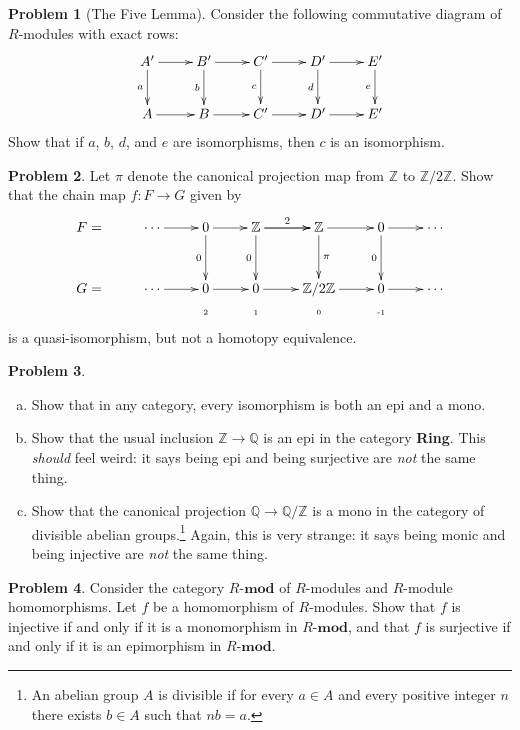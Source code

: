 \documentclass[11pt]{article}
\newcommand{\ZZ}{\mathbb{Z}}
\theoremstyle{definition}
\newtheorem{problem}{Problem}
\begin{document}
\begin{problem}[The Five Lemma]
	Consider the following commutative diagram of $R$-modules with exact rows:
	$$\xymatrix{A' \ar[d]_-a \ar[r] & B' \ar[r] \ar[d]_-b & C' \ar[r] \ar[d]_-c & D' \ar[d]_-d \ar[r] & E' \ar[d]_-e \\
	A \ar[r] & B \ar[r] & C' \ar[r] & D' \ar[r] & E'}$$
	Show that if $a$, $b$, $d$, and $e$ are isomorphisms, then $c$ is an isomorphism.
\end{problem}


\begin{problem}
	Let $\pi$ denote the canonical projection map from $\ZZ$ to $\ZZ/2\ZZ$. Show that the chain map $f\!: F \longrightarrow G$ given by
	$$\xymatrix@R=1mm{F = & \cdots \ar[r] & 0 \ar[r] \ar[dddd]_-0 & \ZZ \ar[r]^-2 \ar[dddd]_-0 \ar[r] & \ZZ \ar[dddd]^-{\pi} \ar[r] & 0 \ar[dddd]_-0 \ar[r] & \cdots \\
	&&&&\\ 
	&&&&\\ 
	&&&&\\ 
	G = &\cdots \ar[r] & 0 \ar[r] & 0 \ar[r] & \ZZ/2\ZZ \ar[r] & 0 \ar[r] & \cdots \\
	&& \textrm{\tiny 2} & \textrm{\tiny 1} & \textrm{\tiny 0} &\textrm{\tiny -1}}$$
	is a quasi-isomorphism, but not a homotopy equivalence.
\end{problem}


\newpage

\begin{problem}$\,$
		\begin{enumerate}[a)]
		\item Show that in any category, every isomorphism is both an epi and a mono.
		\item Show that the usual inclusion $\mathbb{Z} \longrightarrow \mathbb{Q}$ is an epi in the category {\bf Ring}. This \emph{should} feel weird: it says being epi and being surjective are \emph{not} the same thing.
		\item Show that the canonical projection $\mathbb{Q} \longrightarrow \mathbb{Q}/\ZZ$ is a mono in the category of divisible abelian groups.\footnote{An abelian group $A$ is divisible if for every $a \in A$ and every positive integer $n$ there exists $b \in A$ such that $nb = a$.} Again, this is very strange: it says being monic and being injective are \emph{not} the same thing. 
		\end{enumerate}
\end{problem}


\begin{problem}
	Consider the category $R\textbf{-mod}$ of $R$-modules and $R$-module homomorphisms. Let $f$ be a homomorphism of $R$-modules. Show that $f$ is injective if and only if it is a monomorphism in $R\textbf{-mod}$, and that $f$ is surjective if and only if it is an epimorphism in $R\textbf{-mod}$.
\end{problem}
\end{document}
